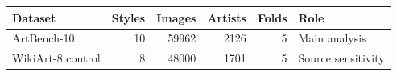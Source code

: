 \begin{tabular}{lrrrrl}
\toprule
Dataset & Styles & Images & Artists & Folds & Role \\
\midrule
ArtBench-10 & 10 & 59962 & 2126 & 5 & Main analysis \\
WikiArt-8 control & 8 & 48000 & 1701 & 5 & Source sensitivity \\
\bottomrule
\end{tabular}
